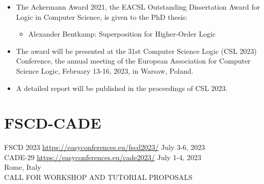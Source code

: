 \documentclass[prodmode,acmtecs]{acmsmall} %
\begin{document}
\begin{itemize}\item  The Ackermann Award 2021, the EACSL Outstanding Dissertation Award for Logic in Computer Science, is given to the PhD thesis: 
 
\begin{itemize}\item   Alexander Bentkamp: Superposition for Higher-Order Logic
\end{itemize} 
\item  The award will be presented at the 31st Computer Science Logic (CSL 2023) Conference, the annual meeting of the European Association for Computer Science Logic, February 13-16, 2023, in Warsaw, Poland. 
 
\item  A detailed report will be published in the proceedings of CSL 2023. 
 
\end{itemize}\section{FSCD-CADE}\label{FSCDCADE}  FSCD 2023 \href{https://easyconferences.eu/fscd2023/}{https://easyconferences.eu/fscd2023/} July 3-6, 2023\\ 
  CADE-29 \href{https://easyconferences.eu/cade2023/}{https://easyconferences.eu/cade2023/} July 1-4, 2023\\ 
  Rome, Italy\\ 
CALL FOR WORKSHOP AND TUTORIAL PROPOSALS 
\end{document}
